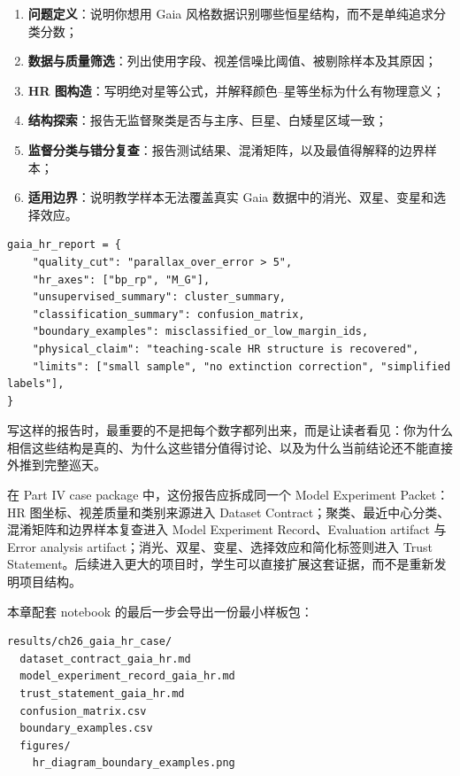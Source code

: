 \begin{enumerate}
    \item \textbf{问题定义}：说明你想用 Gaia 风格数据识别哪些恒星结构，而不是单纯追求分类分数；
    \item \textbf{数据与质量筛选}：列出使用字段、视差信噪比阈值、被剔除样本及其原因；
    \item \textbf{HR 图构造}：写明绝对星等公式，并解释颜色--星等坐标为什么有物理意义；
    \item \textbf{结构探索}：报告无监督聚类是否与主序、巨星、白矮星区域一致；
    \item \textbf{监督分类与错分复查}：报告测试结果、混淆矩阵，以及最值得解释的边界样本；
    \item \textbf{适用边界}：说明教学样本无法覆盖真实 Gaia 数据中的消光、双星、变星和选择效应。
\end{enumerate}

\begin{examplebox}
\begin{lstlisting}[style=pythonstyle]
gaia_hr_report = {
    "quality_cut": "parallax_over_error > 5",
    "hr_axes": ["bp_rp", "M_G"],
    "unsupervised_summary": cluster_summary,
    "classification_summary": confusion_matrix,
    "boundary_examples": misclassified_or_low_margin_ids,
    "physical_claim": "teaching-scale HR structure is recovered",
    "limits": ["small sample", "no extinction correction", "simplified labels"],
}
\end{lstlisting}
\end{examplebox}

写这样的报告时，最重要的不是把每个数字都列出来，而是让读者看见：你为什么相信这些结构是真的、为什么这些错分值得讨论、以及为什么当前结论还不能直接外推到完整巡天。

在 Part IV case package 中，这份报告应拆成同一个 Model Experiment Packet：HR 图坐标、视差质量和类别来源进入 Dataset Contract；聚类、最近中心分类、混淆矩阵和边界样本复查进入 Model Experiment Record、Evaluation artifact 与 Error analysis artifact；消光、双星、变星、选择效应和简化标签则进入 Trust Statement。后续进入更大的项目时，学生可以直接扩展这套证据，而不是重新发明项目结构。

本章配套 notebook 的最后一步会导出一份最小样板包：

\begin{examplebox}
\begin{lstlisting}[style=terminal]
results/ch26_gaia_hr_case/
  dataset_contract_gaia_hr.md
  model_experiment_record_gaia_hr.md
  trust_statement_gaia_hr.md
  confusion_matrix.csv
  boundary_examples.csv
  figures/
    hr_diagram_boundary_examples.png
\end{lstlisting}
\end{examplebox}

